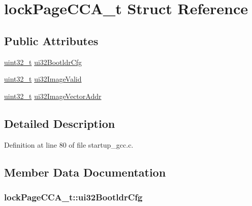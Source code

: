 \hypertarget{structlock_page_c_c_a__t}{}\section{lock\+Page\+C\+C\+A\+\_\+t Struct Reference}
\label{structlock_page_c_c_a__t}
\subsection*{Public Attributes}
\begin{DoxyCompactItemize}
\item 
\hyperlink{_p_e___types_8h_a33594304e786b158f3fb30289278f5af}{uint32\+\_\+t} \hyperlink{structlock_page_c_c_a__t_af364eb3cf5e990aa74ea41c942c7602e}{ui32\+Bootldr\+Cfg}
\item 
\hyperlink{_p_e___types_8h_a33594304e786b158f3fb30289278f5af}{uint32\+\_\+t} \hyperlink{structlock_page_c_c_a__t_a0573834c9ceef140f803ec4add9e0755}{ui32\+Image\+Valid}
\item 
\hyperlink{_p_e___types_8h_a33594304e786b158f3fb30289278f5af}{uint32\+\_\+t} \hyperlink{structlock_page_c_c_a__t_a3be3ba56d40ebd68ce33292d650097c8}{ui32\+Image\+Vector\+Addr}
\end{DoxyCompactItemize}


\subsection{Detailed Description}


Definition at line 80 of file startup\+\_\+gcc.\+c.



\subsection{Member Data Documentation}
\subsubsection[{\texorpdfstring{ui32\+Bootldr\+Cfg}{ui32BootldrCfg}}]{ lock\+Page\+C\+C\+A\+\_\+t\+::ui32\+Bootldr\+Cfg}\hypertarget{structlock_page_c_c_a__t_af364eb3cf5e990aa74ea41c942c7602e}{}\label{structlock_page_c_c_a__t_af364eb3cf5e990aa74ea41c942c7602e}


